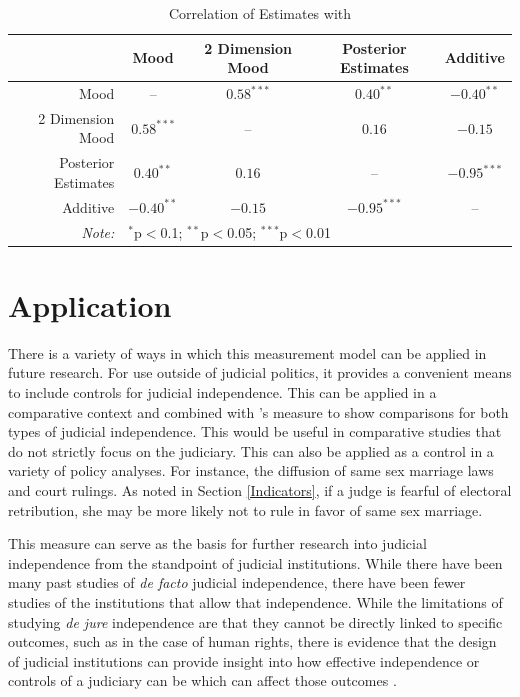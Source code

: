\documentclass[12pt]{article}
\begin{document}
\begin{table}[ht]
	\centering\caption{Correlation of Estimates with \citet{Enns2013}}\label{EKCor}
	\begin{tabular}{rcccc}
		\hline
		&  Mood &  2 Dimension Mood & Posterior Estimates & Additive \\ 
		\hline
		Mood & -- & $0.58^{***}$ & $0.40^{**}$ & $-0.40^{**}$ \\ 
		2 Dimension Mood &  $0.58^{***}$ & -- & $0.16$ & $-0.15$ \\ 
		Posterior Estimates &  $0.40^{**}$  &  $0.16$  & -- & $-0.95^{***}$ \\ 
		Additive & $-0.40^{**}$  & $-0.15$  & $-0.95^{***}$ & -- \\ 
		\hline
		\textit{Note:}  & \multicolumn{4}{l}{$^{*}$p$<$0.1; $^{**}$p$<$0.05; $^{***}$p$<$0.01} \\
	\end{tabular}
\end{table}

\section{Application}\label{Application}
There is a variety of ways in which this measurement model can be applied in future research.  For use outside of judicial politics, it provides a convenient means to include controls for judicial independence.  This can be applied in a comparative context and combined with \citet{Linzer2014}'s measure to show comparisons for both types of judicial independence.  This would be useful in comparative studies that do not strictly focus on the judiciary.  This can also be applied as a control in a variety of policy analyses.  For instance, the diffusion of same sex marriage laws and court rulings.  As noted in Section \ref{Indicators}, if a judge is fearful of electoral retribution, she may be more likely not to rule in favor of same sex marriage.  

This measure can serve as the basis for further research into judicial independence from the standpoint of judicial institutions.  While there have been many past studies of \textit{de facto} judicial independence, there have been fewer studies of the institutions that allow that independence.  While the limitations of studying \textit{de jure} independence are that they cannot be directly linked to specific outcomes, such as in the case of human rights, there is evidence that the design of judicial institutions can provide insight into how effective independence or controls of a judiciary can be which can affect those outcomes \citep{Keith2002a,Keith2002b}.  
\end{document}
